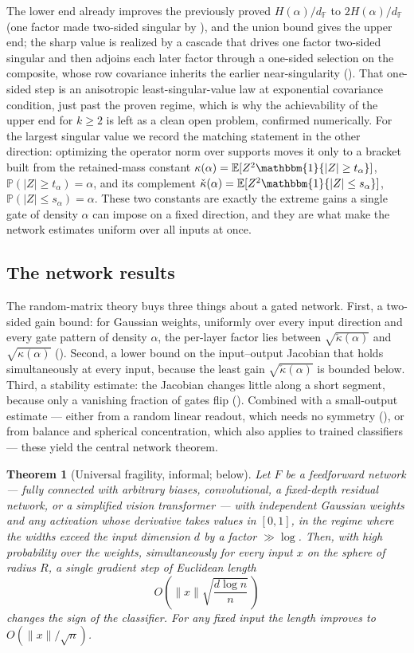 \documentclass[11pt,reqno]{amsart}
\theoremstyle{plain}
\newtheorem{theorem}{Theorem}[section]
\theoremstyle{definition}
\theoremstyle{remark}
\newcommand{\F}{\mathbb{F}}
\newcommand{\PP}{\mathbb{P}}
\newcommand{\EE}{\mathbb{E}}
\newcommand{\one}{\mathbbm{1}}
\newcommand{\dF}{d_{\F}}
\newcommand{\kcheck}{\check{\kappa}}
\begin{document}
The lower end already improves the previously proved $H(\alpha)/\dF$ to $2H(\alpha)/\dF$ (one factor
made two-sided singular by ), and the union bound gives the upper end; the sharp value
is realized by a cascade that drives one factor two-sided singular and then adjoins each later factor
through a one-sided selection on the composite, whose row covariance inherits the earlier near-singularity
(). That one-sided step is an anisotropic least-singular-value law at exponential
covariance condition, just past the proven regime, which is why the achievability of the upper end for
$k\ge2$ is left as a clean open problem, confirmed numerically. For the largest singular value we record
the matching statement in the other direction:
optimizing
the operator norm over supports moves it only to a bracket built from the retained-mass constant
$\kappa(\alpha)=\EE[Z^2\one\{|Z|\ge t_\alpha\}]$, $\PP(|Z|\ge t_\alpha)=\alpha$, and its complement
$\kcheck(\alpha)=\EE[Z^2\one\{|Z|\le s_\alpha\}]$, $\PP(|Z|\le s_\alpha)=\alpha$. These two constants
are exactly the extreme gains a single gate of density $\alpha$ can impose on a fixed direction, and
they are what make the network estimates uniform over all inputs at once.

\subsection{The network results}
The random-matrix theory buys three things about a gated network. First, a two-sided gain bound: for
Gaussian weights, uniformly over every input direction and every gate pattern of density $\alpha$,
the per-layer factor lies between $\sqrt{\kcheck(\alpha)}$ and $\sqrt{\kappa(\alpha)}$
(). Second, a lower bound on the input--output Jacobian that holds
simultaneously at every input, because the least gain $\sqrt{\kcheck(\alpha)}$ is bounded below.
Third, a stability estimate: the Jacobian changes little along a short segment, because only a
vanishing fraction of gates flip (). Combined with a small-output estimate ---
either from a random linear readout, which needs no symmetry (), or from balance
and spherical concentration, which also applies to trained classifiers --- these yield the central
network theorem.

\begin{theorem}[Universal fragility, informal;  below]\label{thm:intro-master}
Let $F$ be a feedforward network --- fully connected with arbitrary biases, convolutional, a
fixed-depth residual network, or a simplified vision transformer --- with independent Gaussian
weights and any activation whose derivative takes values in $[0,1]$, in the regime where the widths
exceed the input dimension $d$ by a factor $\gg\log$. Then, with high probability over the weights,
\emph{simultaneously for every input $x$ on the sphere of radius $R$}, a single gradient step of
Euclidean length
\[
  O\!\left(\|x\|\sqrt{\frac{d\log n}{n}}\,\right)
\]
changes the sign of the classifier. For any fixed input the length improves to $O(\|x\|/\sqrt n)$.
\end{theorem}
\end{document}
